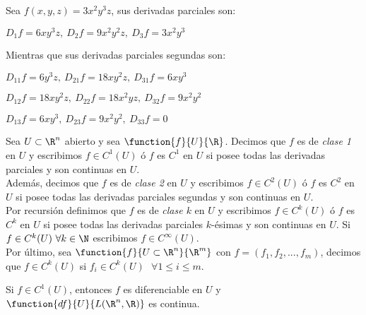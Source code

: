 	\begin{ejem} Sea $f(x,y,z)=3x^2y^3z$, sus derivadas parciales son:
	\begin{center}$D_1f=6xy^3z,\ D_2f=9x^2y^2z,\ D_3f=3x^2y^3$	\end{center}
	Mientras que sus derivadas parciales segundas son:
	\begin{center}$D_{11}f=6y^3z,\ D_{21}f=18xy^2z,\ D_{31}f=6xy^3$	\end{center}
	\begin{center}$D_{12}f=18xy^2z,\ D_{22}f=18x^2yz,\ D_{32}f=9x^2y^2$	\end{center}
	\begin{center}$D_{13}f=6xy^3,\ D_{23}f=9x^2y^2,\ D_{33}f=0$	\end{center}
	\end{ejem}
	
	\begin{defi} Sea $U\subset\R^n$ abierto y sea $\function{f}{U}{\R}$. Decimos que $f$ es de \textit{clase 1} en $U$ y escribimos $f\in C^1(U)$ ó $f$ es $C^1$ en $U$ si posee todas las derivadas parciales y son continuas en $U$.\\ 
	Además, decimos que $f$ es de \textit{clase 2} en $U$ y escribimos $f\in C^2(U)$ ó $f$ es $C^2$ en $U$ si posee todas las derivadas parciales segundas y son continuas en $U$.\\
	Por recursión definimos que $f$ es de \textit{clase $k$} en $U$ y escribimos $f\in C^k(U)$ ó $f$ es $C^k$ en $U$ si posee todas las derivadas parciales $k$-ésimas y son continuas en $U$.
	Si $f\in C^k(U)\ \forall k\in\N$ escribimos $f\in C^\infty(U)$.\\
	Por último, sea $\function{f}{U\subset\R^n}{\R^m}$ con $f=(f_1,f_2,...,f_m)$, decimos que $f\in C^k(U)$ si $f_i\in C^k(U)\ \ \ \forall 1\leq i\leq m$.
	\end{defi}
	
	\begin{observacion} Si $f\in C^1(U)$, entonces $f$ es diferenciable en $U$ y $\function{df}{U}{L(\R^n,\R)}$ es continua.
	\end{observacion}
	
